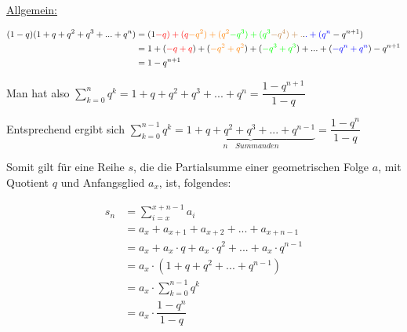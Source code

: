 \documentclass[main.tex]{subfiles}
\begin{document}
\begin{Beweis}
	\underline{Allgemein:}

	\begin{align*}
		(1-q)(1+q+q^2+q^3+...+q^n)&=(1\textcolor{red}{-q)+(q}\textcolor{orange}{-q^2)+(q^2}\textcolor{green}{-q^3)+(q^3}\textcolor{brown}{-q^4)+.}.\textcolor{blue}{.+(q^n}-q^{n+1})\\
		&=1+(\textcolor{red}{-q+q})+(\textcolor{orange}{-q^2+q^2})+(\textcolor{green}{-q^3+q^3})+...+(\textcolor{blue}{-q^n+q^n})-q^{n+1}\\
		&=1-q^{n+1}
	\end{align*}

	Man hat also $\sum\limits_{k=0}^nq^k=1+q+q^2+q^3+...+q^n=\dfrac{1-q^{n+1}}{1-q}$

	Entsprechend ergibt sich $\sum\limits_{k=0}^{n-1}q^k=\underbrace{1+q+q^2+q^3+...+q^{n-1}}_{n\quad Summanden}=\dfrac{1-q^n}{1-q}$
	
	Somit gilt für eine Reihe $s$, die die Partialsumme einer geometrischen Folge $a$, mit Quotient $q$ und Anfangsglied $a_{x}$, ist, folgendes:
	
	\begin{align*}
		s_{n}&=\sum\limits_{i=x}^{x+n-1}a_{i}\\
		&=a_{x}+a_{x+1}+a_{x+2}+...+a_{x+n-1}\\
		&=a_{x}+a_{x}\cdot q+a_{x}\cdot q^{2}+...+a_{x}\cdot q^{n-1}\\
		&=a_{x}\cdot(1+q+q^2+...+q^{n-1})\\
		&=a_{x}\cdot \sum\limits_{k=0}^{n-1}q^k\\
		&=a_{x}\cdot \dfrac{1-q^{n}}{1-q}
		\end{align*}
	\end{Beweis}
\end{document}
